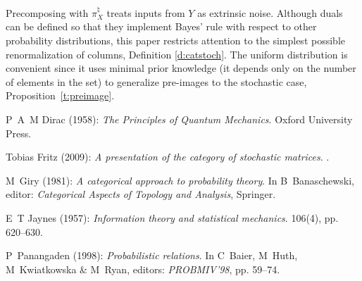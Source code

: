 \documentclass[12pt]{article}
\theoremstyle{remark}
\begin{document}
Precomposing with $\pi_X^\natural$ treats inputs from $Y$ as 
extrinsic noise. Although duals can be defined so that they 
implement Bayes' rule with respect to other probability distributions, 
this paper restricts attention to the simplest possible renormalization 
of columns, Definition \ref{d:catstoch}. The uniform distribution is 
convenient since it uses minimal prior knowledge (it depends only on the 
number of elements in the set) to generalize pre-images to the stochastic 
case, Proposition~\ref{t:preimage}.

\begin{thebibliography}{99}
\providecommand{\urlprefix}{Available at }
\providecommand{\url}[1]{\texttt{#1}}
\providecommand{\href}[2]{\texttt{#2}}
\providecommand{\urlalt}[2]{\href{#1}{#2}}
\providecommand{\doi}[1]{doi:\urlalt{http://dx.doi.org/#1}{#1}}
\providecommand{\bibinfo}[2]{#2}

\bibinfo{author}{P~A~M Dirac} (\bibinfo{year}{1958}): \emph{\bibinfo{title}{The
  {P}rinciples of {Q}uantum {M}echanics}}.
\newblock \bibinfo{publisher}{Oxford University Press}.

\bibinfo{author}{Tobias Fritz} (\bibinfo{year}{2009}): \emph{\bibinfo{title}{A
  presentation of the category of stochastic matrices}}.
\newblock {\sl \bibinfo{journal}{arXiv:0902.2554v1}} .

\bibinfo{author}{M~Giry} (\bibinfo{year}{1981}): \emph{\bibinfo{title}{A
  categorical approach to probability theory}}.
\newblock In \bibinfo{editor}{B~Banaschewski}, editor: {\sl
  \bibinfo{booktitle}{Categorical {A}spects of {T}opology and {A}nalysis}},
  \bibinfo{publisher}{Springer}.

\bibinfo{author}{E~T Jaynes} (\bibinfo{year}{1957}):
  \emph{\bibinfo{title}{Information theory and statistical mechanics}}.
\newblock {\sl \bibinfo{journal}{Phys. Rev.}}
  \bibinfo{volume}{106}(\bibinfo{number}{4}), pp. \bibinfo{pages}{620--630}.
  
\bibinfo{author}{P~Panangaden} (\bibinfo{year}{1998}):
  \emph{\bibinfo{title}{Probabilistic relations}}.
\newblock In \bibinfo{editor}{C~Baier}, \bibinfo{editor}{M~Huth},
  \bibinfo{editor}{M~Kwiatkowska} \& \bibinfo{editor}{M~Ryan}, editors: {\sl
  \bibinfo{booktitle}{PROBMIV'98}}, pp. \bibinfo{pages}{59--74}.

\end{thebibliography}
\end{document}
